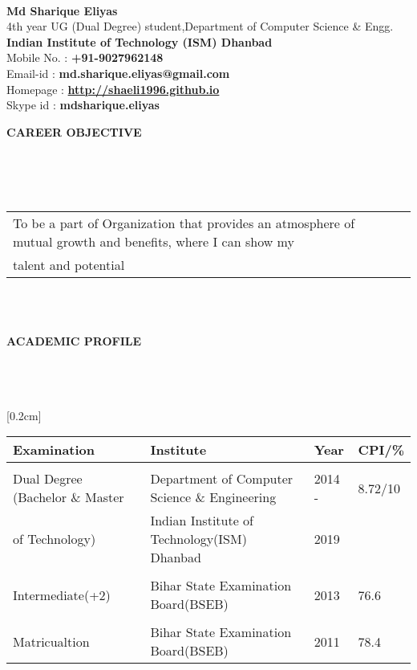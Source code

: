 \documentclass[a4paper,10pt]{article}
\newcommand{\lsep}{-0.5cm}
\newcommand{\resheading}[1]{{\small \colorbox{mygrey}{\begin{minipage}{0.975\textwidth}{\textbf{#1 \vphantom{p\^{E}}}}\end{minipage}}}}
\begin{document}
\hspace{0.5cm}\\[-0.2cm]

\textbf {\Large Md Sharique Eliyas} \\
\indent 4th year UG (Dual Degree) student,Department of Computer Science \& Engg. \\
\indent \textbf {Indian Institute of Technology (ISM) Dhanbad}\\
\indent Mobile No. : \textbf{+91-9027962148} \\
\indent Email-id : \textbf{md.sharique.eliyas@gmail.com} \\
\indent Homepage : \textbf{\url{http://shaeli1996.github.io}} \\
\indent Skype id : \textbf{mdsharique.eliyas} \\

\resheading{\textbf{CAREER OBJECTIVE} }\\[\lsep]
\\ \\
\indent \begin{tabular}{ l @{\hskip 0.3in} l @{\hskip 0.3in} l @{\hskip 0.3in} l}
To be a part of Organization that provides an atmosphere of mutual growth and benefits, where I can show my\\
talent and potential \\
[-0.6cm]
\end{tabular}
\\ \\

\resheading{\textbf{ACADEMIC PROFILE} }\\[\lsep]
\\ \\
[0.2cm]
\indent \begin{tabular}{ l @{\hskip 0.3in} l @{\hskip 0.3in} l @{\hskip 0.3in} l}
\hline
\textbf{Examination} & \textbf{Institute} & \textbf{Year} & \textbf{CPI/\%} \\
\hline
\\
Dual Degree (Bachelor \& Master & Department of Computer Science \& Engineering & 2014 - & 8.72/10 \\
of Technology) & Indian Institute of Technology(ISM) Dhanbad & 2019\\
\\
Intermediate(+2) & Bihar State Examination Board(BSEB) & 2013 & 76.6 \\
\\
Matricualtion & Bihar State Examination Board(BSEB) & 2011 & 78.4 \\
\end{tabular}
\\ \\
\end{document}
